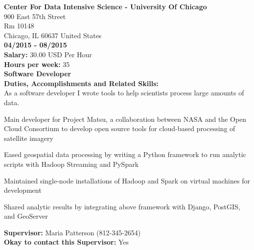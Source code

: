 \noindent\textbf{Center For Data Intensive Science - University Of Chicago}\\
900 East 57th Street\\
Rm 10148\\
Chicago, IL   60637 United States\\
\textbf{04/2015 - 08/2015}\\
\textbf{Salary:} 30.00  USD Per Hour\\
\textbf{Hours per week:} 35\\
\textbf{Software Developer}\\
\textbf{Duties, Accomplishments and Related Skills:}\\
As a software developer I wrote tools to help scientists process large amounts of data.
\begin{tightlist}

\item Main developer for Project Matsu, a collaboration between NASA and the Open Cloud Consortium to develop open source tools for cloud-based processing of satellite imagery

\item Eased geospatial data processing by writing a Python framework to run analytic scripts with Hadoop Streaming and PySpark

\item Maintained single-node installations of Hadoop and Spark on virtual machines for development

\item Shared analytic results by integrating above framework with Django, PostGIS, and GeoServer
\end{tightlist}
\textbf{Supervisor:} Maria Patterson (812-345-2654)\\
\textbf{Okay to contact this Supervisor:} Yes\\

